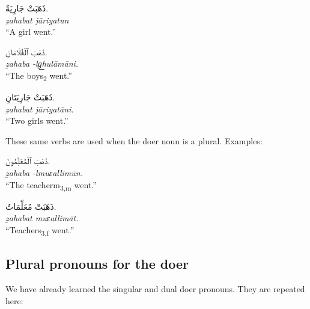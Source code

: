 \documentclass[
  10pt,
]{book}
\begin{document}
\foreignlanguage{arabic}{ذَهَبَتْ جَارِيَةٌ.}\\
\emph{ẕahabat jāriyatun}\\
\enquote{A girl went.}

\foreignlanguage{arabic}{ذَهَبَ ٱلْغُلَامَانِ.}\\
\emph{ẕahaba -lg͟hulāmāni.}\\
\enquote{The boys\textsubscript{2} went.}

\foreignlanguage{arabic}{ذَهَبَتْ جَارِيَتَانِ.}\\
\emph{ẕahabat jāriyatāni.}\\
\enquote{Two girls went.}

These same verbs are used when the doer noun is a plural. Examples:

\foreignlanguage{arabic}{ذَهَبَ ٱلْمُعَلِّمُونَ.}\\
\emph{ẕahaba -lmuɛallimūn.}\\
\enquote{The teacherm\textsubscript{3,m} went.}

\foreignlanguage{arabic}{ذَهَبَتْ مُعَلِّمَاتٌ.}\\
\emph{ẕahabat muɛallimāt.}\\
\enquote{Teachers\textsubscript{3,f} went.}

\subsection{Plural pronouns for the doer}\label{plural-pronouns-for-the-doer}

We have already learned the singular and dual doer pronouns. They are repeated here:
\end{document}

